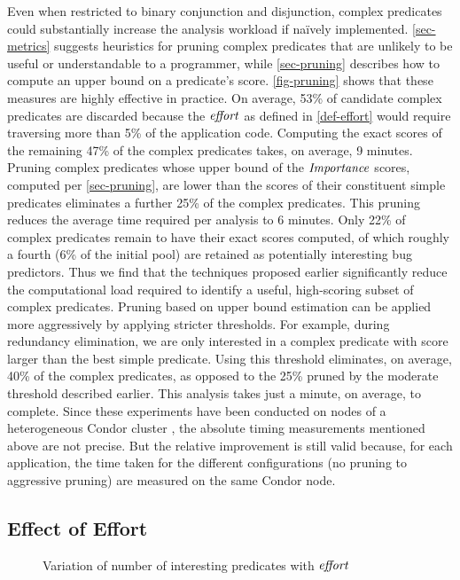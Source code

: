 Even when restricted to binary conjunction and disjunction, complex predicates could substantially increase the analysis workload if na\"ively implemented.  \autoref{sec-metrics} suggests heuristics for pruning complex predicates that are unlikely to be useful or understandable to a programmer, while \autoref{sec-pruning} describes how to compute an upper bound on a predicate's score.  \autoref{fig-pruning} shows that these measures are highly effective in practice.  On average, 53\% of candidate complex predicates are discarded because the $\mathit{effort}$ as defined in \autoref{def-effort} would require traversing more than 5\% of the application code. Computing the exact scores of the remaining 47\% of the complex predicates takes, on average, 9 minutes.  Pruning complex predicates whose upper bound of the $\mathit{Importance}$ scores, computed per \autoref{sec-pruning}, are lower than the scores of their constituent simple predicates eliminates a further 25\% of the complex predicates.  This pruning reduces the average time required per analysis to 6 minutes.  Only 22\% of complex predicates remain to have their exact scores computed, of which roughly a fourth (6\% of the initial pool) are retained as potentially interesting bug predictors.  Thus we find that the techniques proposed earlier significantly reduce the computational load required to identify a useful, high-scoring subset of complex predicates.  Pruning based on upper bound estimation can be applied more aggressively by applying stricter thresholds.  For example, during redundancy elimination, we are only interested in a complex predicate with score larger than the best simple predicate.  Using this threshold eliminates, on average, 40\% of the complex predicates, as opposed to the 25\% pruned by the moderate threshold described earlier.  This analysis takes just a minute, on average, to complete.  Since these experiments have been conducted on nodes of a heterogeneous Condor cluster \cite{condor-hunter}, the absolute timing measurements mentioned above are not precise.  But the relative improvement is still valid because, for each application, the time taken for the different configurations (no pruning to aggressive pruning) are measured on the same Condor node.

\subsection{Effect of Effort}

\begin{figure*}[tb]
  \centering
  \hfill
  \caption{Variation of number of interesting predicates with $\mathit{effort}$}
  \label{fig-effort}
\end{figure*}

